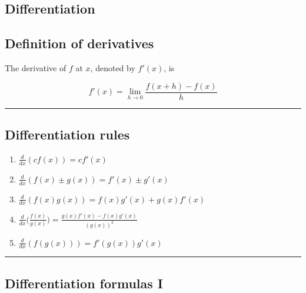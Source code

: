 \documentclass[
  landscape,  
  10pt,
]{article}
\author{}
\date{\vspace{-2.5em}}
\begin{document}
\begin{multicols}{3}

\hypertarget{differentiation}{%
\section{Differentiation}\label{differentiation}}

\hypertarget{definition-of-derivatives}{%
\subsection{Definition of derivatives}\label{definition-of-derivatives}}

The derivative of \(f\) at \(x\), denoted by \(f'(x)\), is

\[ f'(x) = \lim_{h\to 0}\frac{f(x+h)-f(x)}{h} \]

\begin{center}\rule{0.5\linewidth}{0.5pt}\end{center}

\hypertarget{differentiation-rules}{%
\subsection{Differentiation rules}\label{differentiation-rules}}

\begin{enumerate}
\def\labelenumi{\arabic{enumi}.}
\item
  \(\displaystyle\frac{d}{dx}(cf(x))= cf'(x)\)
\item
  \(\displaystyle\frac{d}{dx}(f(x) \pm g(x)) = f'(x) \pm g'(x)\)
\item
  \(\displaystyle\frac{d}{dx}(f(x)g(x)) = f(x)g'(x) + g(x)f'(x)\)
\item
  \(\displaystyle\frac{d}{dx}\Big(\frac{f(x)}{g(x)}\Big) = \frac{g(x)f'(x)-f(x)g'(x)}{(g(x))^2}\)
\item
  \(\displaystyle\frac{d}{dx}(f(g(x))) = f'(g(x))g'(x)\)
\end{enumerate}

\begin{center}\rule{0.5\linewidth}{0.5pt}\end{center}

\hypertarget{differentiation-formulas-i}{%
\subsection{Differentiation formulas
I}\label{differentiation-formulas-i}}


\end{multicols}
\end{document}
